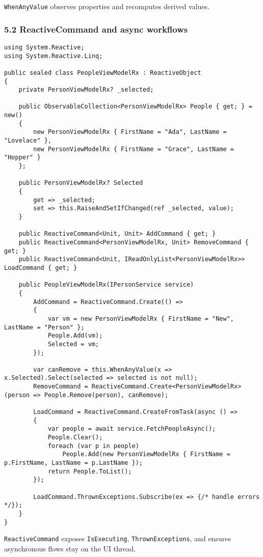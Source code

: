 \passthrough{\lstinline!WhenAnyValue!} observes properties and
recomputes derived values.

\subsubsection{5.2 ReactiveCommand and async
workflows}\label{reactivecommand-and-async-workflows}

\begin{lstlisting}
using System.Reactive;
using System.Reactive.Linq;

public sealed class PeopleViewModelRx : ReactiveObject
{
    private PersonViewModelRx? _selected;

    public ObservableCollection<PersonViewModelRx> People { get; } = new()
    {
        new PersonViewModelRx { FirstName = "Ada", LastName = "Lovelace" },
        new PersonViewModelRx { FirstName = "Grace", LastName = "Hopper" }
    };

    public PersonViewModelRx? Selected
    {
        get => _selected;
        set => this.RaiseAndSetIfChanged(ref _selected, value);
    }

    public ReactiveCommand<Unit, Unit> AddCommand { get; }
    public ReactiveCommand<PersonViewModelRx, Unit> RemoveCommand { get; }
    public ReactiveCommand<Unit, IReadOnlyList<PersonViewModelRx>> LoadCommand { get; }

    public PeopleViewModelRx(IPersonService service)
    {
        AddCommand = ReactiveCommand.Create(() =>
        {
            var vm = new PersonViewModelRx { FirstName = "New", LastName = "Person" };
            People.Add(vm);
            Selected = vm;
        });

        var canRemove = this.WhenAnyValue(x => x.Selected).Select(selected => selected is not null);
        RemoveCommand = ReactiveCommand.Create<PersonViewModelRx>(person => People.Remove(person), canRemove);

        LoadCommand = ReactiveCommand.CreateFromTask(async () =>
        {
            var people = await service.FetchPeopleAsync();
            People.Clear();
            foreach (var p in people)
                People.Add(new PersonViewModelRx { FirstName = p.FirstName, LastName = p.LastName });
            return People.ToList();
        });

        LoadCommand.ThrownExceptions.Subscribe(ex => {/* handle errors */});
    }
}
\end{lstlisting}

\passthrough{\lstinline!ReactiveCommand!} exposes
\passthrough{\lstinline!IsExecuting!},
\passthrough{\lstinline!ThrownExceptions!}, and ensures asynchronous
flows stay on the UI thread.

